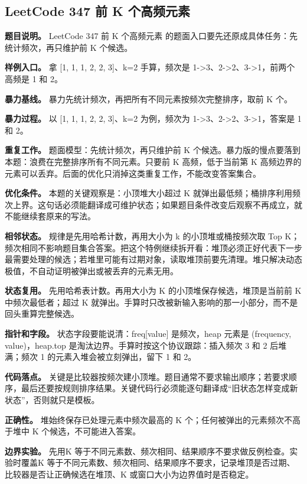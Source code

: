 \subsection{LeetCode 347 前 K 个高频元素}

\textbf{题目说明。} LeetCode 347 前 K 个高频元素 的题面入口要先还原成具体任务：先统计频次，再只维护前 K 个候选。

\textbf{样例入口。} 拿 [1, 1, 1, 2, 2, 3]、k=2 手算，频次是 1->3、2->2、3->1，前两个高频是 1 和 2。

\textbf{暴力基线。} 暴力先统计频次，再把所有不同元素按频次完整排序，取前 K 个。

\textbf{暴力过程。} 以 [1, 1, 1, 2, 2, 3]、k=2 为例，频次为 1->3、2->2、3->1，答案是 1 和 2。

\textbf{重复工作。} 题面模型：先统计频次，再只维护前 K 个候选。暴力版的慢点要落到本题：浪费在完整排序所有不同元素。只要前 K 高频，低于当前第 K 高频边界的元素可以丢弃。后面的优化只消掉这类重复工作，不能改变答案集合。

\textbf{优化条件。} 本题的关键观察是：小顶堆大小超过 K 就弹出最低频；桶排序利用频次上界。这句话必须能翻译成可维护状态；如果题目条件改变后观察不再成立，就不能继续套原来的写法。

\textbf{相邻状态。} 规律是先用哈希计数，再用大小为 k 的小顶堆或桶按频次取 Top K；频次相同不影响题目集合答案。把这个特例继续拆开看：堆顶必须正好代表下一步最需要处理的候选；若堆里可能有过期对象，读取堆顶前要先清理。堆只解决动态极值，不自动证明被弹出或被丢弃的元素无用。

\textbf{状态复用。} 先用哈希表计数。再用大小为 K 的小顶堆保存候选，堆顶是当前前 K 中频次最低者；超过 K 就弹出。手算时只改被新输入影响的那一小部分，而不是回头重算完整候选。

\textbf{指针和字段。} 状态字段要能说清：freq[value] 是频次，heap 元素是 (frequency, value)，heap.top 是淘汰边界。手算时按这个协议跟踪：插入频次 3 和 2 后堆满；频次 1 的元素入堆会被立刻弹出，留下 1 和 2。

\textbf{代码落点。} 关键是比较器按频次建小顶堆。题目通常不要求输出顺序；若要求顺序，最后还要按规则排序结果。关键代码行必须能逐句翻译成“旧状态怎样变成新状态”，否则就只是模板。

\textbf{正确性。} 堆始终保存已处理元素中频次最高的 K 个；任何被弹出的元素频次不高于堆中 K 个候选，不可能进入答案。

\textbf{边界实验。} 先用K 等于不同元素数、频次相同、结果顺序不要求做反例检查。实验时覆盖K 等于不同元素数、频次相同、结果顺序不要求，记录堆顶是否过期、比较器是否让正确候选在堆顶、K 或窗口大小为边界值时是否稳定。

